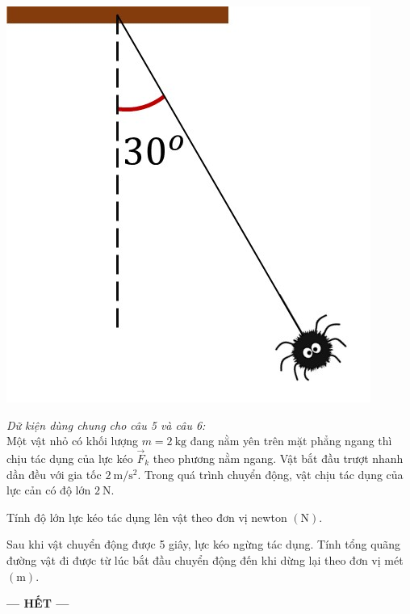 \begin{ex}
	{\includegraphics[width=0.45\linewidth]{../figs/D10-HKI-KTTX2-001-2}}
	\loigiai{
		
	}
\end{ex}
\textit{Dữ kiện dùng chung cho câu 5 và câu 6:}\\
Một vật nhỏ có khối lượng $m=\SI{2}{\kilogram}$ đang nằm yên trên mặt phẳng ngang thì chịu tác dụng của lực kéo $\vec{F}_k$ theo phương nằm ngang. Vật bắt đầu trượt nhanh dần đều với gia tốc $\SI{2}{\meter/\second^2}$. Trong quá trình chuyển động, vật chịu tác dụng của lực cản có độ lớn $\SI{2}{\newton}$.
\begin{ex}
Tính độ lớn lực kéo tác dụng lên vật theo đơn vị newton $\left(\si{\newton}\right)$.	
	\loigiai{
			}
\end{ex}
\begin{ex}
Sau khi vật chuyển động được 5 giây, lực kéo ngừng tác dụng. Tính tổng quãng đường vật đi được từ lúc bắt đầu chuyển động đến khi dừng lại theo đơn vị mét $\left(\si{\meter}\right)$.	
	\loigiai{
		
	}
\end{ex}
\begin{center}
	\textbf{--- HẾT ---}
\end{center}